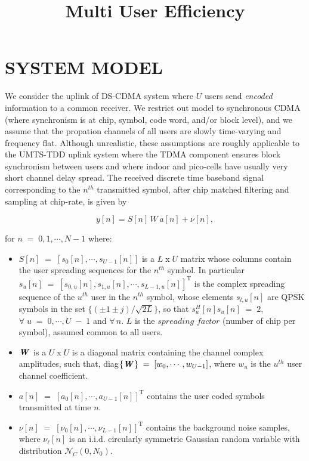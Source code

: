 \documentclass[a4paper,10pt]{article}
\title{Multi User Efficiency}
\begin{document}
\section{SYSTEM MODEL}
We consider the uplink of DS-CDMA system where $\textit{U}$ users send \textit{encoded} information to a common receiver. We restrict out model to synchronous CDMA (where synchronism is at chip, symbol, code word, and/or block level), and we assume that the propation channels of all users are slowly time-varying and frequency flat. Although unrealistic, these assumptions are roughly applicable to the UMTS-TDD uplink system where the TDMA component ensures block synchronism between users and where indoor and pico-cells have usually very short channel delay spread. The received discrete time baseband signal corresponding to the $n^{th}$ transmitted symbol, after chip matched filtering and sampling at chip-rate, is given by

\begin{equation}
	y[n]=S[n]\,\mathbf{\mathit{W}}\,a[n]+\nu[n],
\end{equation}

for $n\;=\;0,1,\cdots,N-1$ where:

\begin{itemize}

\item $S[n]\;=\;[s_0[n],\cdots,s_{U-1}[n]]$ is a $L\;$x$\;U$ matrix whose columns contain the user spreading sequences for the $n^{th}$ symbol. In particular $s_u[n]\;=\;[s_{0,u}[n],s_{1,u}[n],\cdots,s_{L-1,u}[n]]^\mathrm{T}$ is the complex spreading sequence of the $u^{th}$ user in the $n^{th}$ symbol, whose elements $s_{l,u}[n]$ are QPSK symbols in the set $\{(\pm 1 \pm j)/\sqrt{2L}\}$, so that $s_u^H[n]s_u[n]\;=\;2$, $\forall\;u\;=\;0,\cdots,U\;-\;1$ and $\forall \,n$. $L$ is the $\textit{spreading factor}$ (number of chip per symbol), assumed common to all users.

\item $\textbf{\textit{W}}$ is a $U\;$x$\;U$ is a diagonal matrix containing the channel complex amplitudes, such that, diag$\{\textbf{\textit{W}}\}\;=\;[w_0,\cdots,w_{U-1}]$, where $w_u$ is the $u^{th}$ user channel coefficient.

\item $a[n]\;=\;[a_0[n],\cdots,a_{U-1}[n]]^\mathrm{T}$ contains the user coded symbols transmitted at time $n$.

\item $\nu[n]\;=\;[\nu_0[n],\cdots,\nu_{L-1}[n]]^\mathrm{T}$ contains the background noise samples, where $\nu_{\ell}[n]$ is an i.i.d. circularly symmetric Gaussian random variable with distribution $\mathcal{N}_C(0,N_0)$.

\end{itemize}
\end{document}
